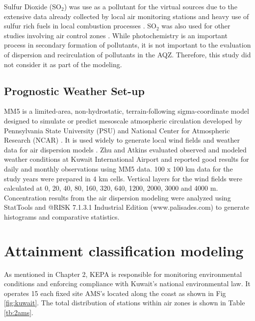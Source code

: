 Sulfur Dioxide (SO$_{2}$) was use as a pollutant for the virtual sources due to the extensive data already collected by local air monitoring stations and heavy use of sulfur rich fuels in local combustion processes \citep{Al-Awadhi2014, Al-Rashidi2005}.  SO$_{2}$ was also used for other studies involving air control zones \citep{Hao2000, Henschel2013, Pereira2007}.  While photochemistry is an important process in secondary formation of pollutants, it is not important to the evaluation of dispersion and recirculation of pollutants in the AQZ.  Therefore, this study did not consider it as part of the modeling. 

\subsection{Prognostic Weather Set-up}

MM5 is a limited-area, non-hydrostatic, terrain-following sigma-coordinate model designed to simulate or predict mesoscale atmospheric circulation developed by Pennsylvania State University (PSU) and National Center for Atmospheric Research (NCAR) \citep{Grell1994}.  It is used widely to generate local wind fields and weather data for air dispersion models \citep{Ghannam2013a, Lee2009, Tsai2011, Zhu2004}.  Zhu and Atkins evaluated observed and modeled weather conditions at Kuwait International Airport and reported good results for daily and monthly observations using MM5 data.  100 x 100 km data for the study years were prepared in 4 km cells. Vertical layers for the wind fields were calculated at 0, 20, 40, 80, 160, 320, 640, 1200, 2000, 3000 and 4000 m. Concentration results from the air dispersion modeling were analyzed using StatTools and @RISK 7.1.3.1 Industrial Edition (www.palisades.com) to generate histograms and comparative statistics. 
\clearpage
\section{Attainment classification modeling}

As mentioned in Chapter 2, KEPA is responsible for monitoring environmental conditions and enforcing compliance with Kuwait's national environmental law. It operates 15 each fixed site AMS’s located along the coast as shown in Fig \ref{fig:kuwait}.  The total distribution of stations within air zones is shown in Table \ref{tb:2ams}. 

